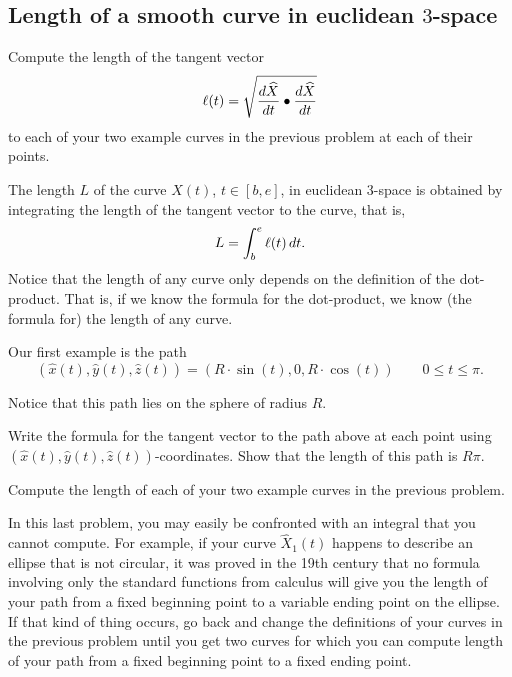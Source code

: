 \documentclass{ximera}
\begin{document}
\subsection*{Length of a smooth curve in euclidean $3$-space}

\begin{problem}
Compute the length of the tangent vector
\[
\l(t)=\sqrt{\frac{d\hat{X}}{dt}\bullet\frac{d\hat{X}}{dt}}%
\]
to each of your two example curves in the previous problem at each of
their points.
\end{problem}

\begin{definition}
The length $L$ of the curve $\hat{X}(t)$, $t\in[b,e] $, in euclidean
$3$-space is obtained by integrating the length of the tangent vector
to the curve, that is,%
\[
L=\int_{b}^{e} \ell(t)  \,dt.
\]
  Notice that the length of any curve only depends on the definition of
the dot-product. That is, if we know the formula for the dot-product, we know
(the formula for) the length of any curve.
\end{definition}

Our first example is the path%
\[
\left(\hat{x}(t),\hat{y}(t),\hat{z}(t)\right)=\left(R\cdot\sin(t),0,R\cdot\cos(t)\right) \qquad
0 \leq t\leq\pi.
\]


Notice that this path lies on the sphere of radius $R$.

\begin{problem}
Write the formula for the tangent vector to the path above at each
point using
$\left(\hat{x}(t),\hat{y}(t),\hat{z}(t)\right)$-coordinates. Show that
the length of this path is $R\pi$.
\end{problem}

\begin{problem}
Compute the length of each of your two example curves in the previous
problem.
\end{problem}

\begin{remark}
In this last problem, you may easily be confronted with an integral
that you cannot compute. For example, if your curve $\hat{X}_{1}\left(
t\right) $ happens to describe an ellipse that is not circular, it was
proved in the 19th century that no formula involving only the
standard functions from calculus will give you the length of your path
from a fixed beginning point to a variable ending point on the
ellipse. If that kind of thing occurs, go back and change the
definitions of your curves in the previous problem until you get two
curves for which you can compute length of your path from a fixed
beginning point to a fixed ending point. %
\end{remark}
\end{document}
